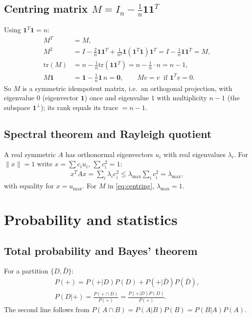 \subsection{Centring matrix $M=I_n-\frac1n\mathbf 1\mathbf 1^T$}
Using $\mathbf 1^T\mathbf 1=n$:
\begin{align}
M^T&=M,\\
M^2&=I-\tfrac2n\mathbf 1\mathbf 1^T+\tfrac1{n^2}\mathbf 1(\mathbf 1^T\mathbf 1)\mathbf 1^T=I-\tfrac1n\mathbf 1\mathbf 1^T=M,\\
\mathrm{tr}(M)&=n-\tfrac1n\mathrm{tr}(\mathbf 1\mathbf 1^T)=n-\tfrac1n\cdot n=n-1,\\
M\mathbf 1&=\mathbf 1-\tfrac1n\mathbf 1\,n=\mathbf 0,\qquad Mv=v\ \text{ if }\mathbf 1^Tv=0. \label{eq:centring}
\end{align}
So $M$ is a symmetric idempotent matrix, i.e.\ an orthogonal projection, with eigenvalue $0$ (eigenvector
$\mathbf 1$) once and eigenvalue $1$ with multiplicity $n-1$ (the subspace $\mathbf 1^\perp$);
its rank equals its trace $=n-1$.

\subsection{Spectral theorem and Rayleigh quotient}
A real symmetric $A$ has orthonormal eigenvectors $u_i$ with real eigenvalues $\lambda_i$. For
$\|x\|=1$ write $x=\sum c_iu_i$, $\sum c_i^2=1$:
\begin{align}
x^TAx=\sum_i\lambda_ic_i^2\le\lambda_{\max}\sum_ic_i^2=\lambda_{\max}, \label{eq:rayleigh}
\end{align}
with equality for $x=u_{\max}$. For $M$ in \eqref{eq:centring}, $\lambda_{\max}=1$.

\section{Probability and statistics}

\subsection{Total probability and Bayes' theorem}
For a partition $\{D,\bar D\}$:
\begin{align}
P(+)=P(+|D)P(D)+P(+|\bar D)P(\bar D), \label{eq:totalprob}\\
P(D|+)=\frac{P(+\cap D)}{P(+)}=\frac{P(+|D)P(D)}{P(+)}. \label{eq:bayes}
\end{align}
The second line follows from $P(A\cap B)=P(A|B)P(B)=P(B|A)P(A)$.

